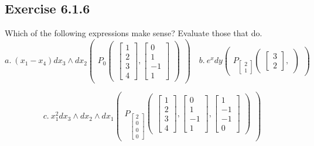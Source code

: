 \documentclass[12pt]{article}
\begin{document}
\subsection*{Exercise 6.1.6}
Which of the following expressions make sense? Evaluate those that do.
$$a.\ (x_1-x_4)dx_3\wedge dx_2
        \begin{pmatrix}
        P_0
        \begin{pmatrix}
          \begin{bmatrix}
           1\\2\\3\\4
          \end{bmatrix},
          \begin{bmatrix}
           0\\1\\-1\\1
         \end{bmatrix}
    \end{pmatrix}
    \end{pmatrix}
    \quad
    b.\ e^xdy
        \begin{pmatrix}
        P_{\begin{bmatrix}
         2\\1
        \end{bmatrix}}
        \begin{pmatrix}
          \begin{bmatrix}
           3\\2
          \end{bmatrix},
    \end{pmatrix}
    \end{pmatrix}
$$

$$
    c.\ x_1^2dx_3\wedge dx_2\wedge dx_1
        \begin{pmatrix}
        P_{\begin{bmatrix}
         2\\0\\0\\0
        \end{bmatrix}}
        \begin{pmatrix}
          \begin{bmatrix}
           1\\2\\3\\4
          \end{bmatrix},
          \begin{bmatrix}
           0\\1\\-1\\1
          \end{bmatrix},
          \begin{bmatrix}
          1\\-1\\-1\\0
          \end{bmatrix}
    \end{pmatrix}
    \end{pmatrix}
$$
\medskip
\end{document}
